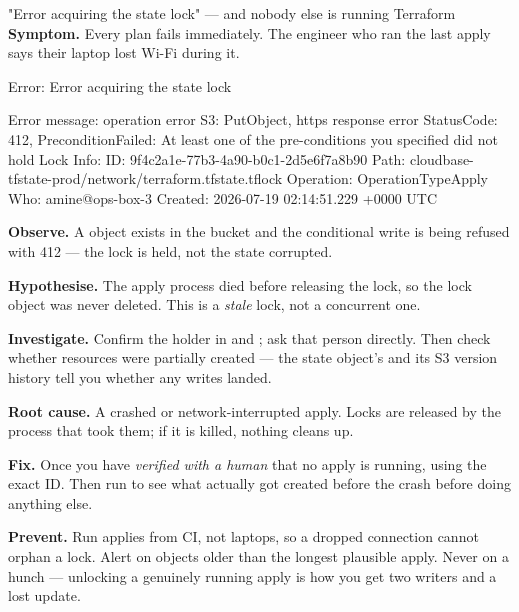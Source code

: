 \begin{debuglab}{"Error acquiring the state lock" --- and nobody else is running Terraform}
\textbf{Symptom.} Every plan fails immediately. The engineer who ran the last apply says their laptop lost Wi-Fi during it.

\begin{outbox}
Error: Error acquiring the state lock

Error message: operation error S3: PutObject, https response error
StatusCode: 412, PreconditionFailed: At least one of the pre-conditions
you specified did not hold
Lock Info:
  ID:        9f4c2a1e-77b3-4a90-b0c1-2d5e6f7a8b90
  Path:      cloudbase-tfstate-prod/network/terraform.tfstate.tflock
  Operation: OperationTypeApply
  Who:       amine@ops-box-3
  Created:   2026-07-19 02:14:51.229 +0000 UTC
\end{outbox}

\begin{tickcheck}
  \item \textbf{Observe.} A  object exists in the bucket and the conditional write is being refused with 412 --- the lock is held, not the state corrupted.
  \item \textbf{Hypothesise.} The apply process died before releasing the lock, so the lock object was never deleted. This is a \emph{stale} lock, not a concurrent one.
  \item \textbf{Investigate.} Confirm the holder in  and ; ask that person directly. Then check whether resources were partially created --- the state object's  and its S3 version history tell you whether any writes landed.
  \item \textbf{Root cause.} A crashed or network-interrupted apply. Locks are released by the process that took them; if it is killed, nothing cleans up.
  \item \textbf{Fix.} Once you have \emph{verified with a human} that no apply is running,  using the exact ID. Then run  to see what actually got created before the crash before doing anything else.
  \item \textbf{Prevent.} Run applies from CI, not laptops, so a dropped connection cannot orphan a lock. Alert on  objects older than the longest plausible apply. Never  on a hunch --- unlocking a genuinely running apply is how you get two writers and a lost update.
\end{tickcheck}
\end{debuglab}

